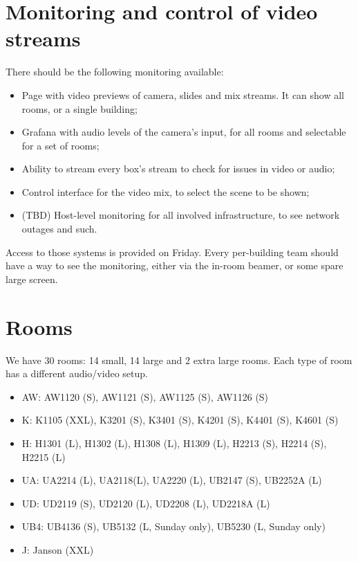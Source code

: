 \documentclass{article}
\begin{document}
\section{Monitoring and control of video streams}

There should be the following monitoring available:

\begin{itemize}
  \item Page with video previews of camera, slides and mix streams. It can show all rooms, or a single building;
  \item Grafana with audio levels of the camera's input, for all rooms and selectable for a set of rooms;
  \item Ability to stream every box's stream to check for issues in video or audio;
  \item Control interface for the video mix, to select the scene to be shown;
  \item (TBD) Host-level monitoring for all involved infrastructure, to see network outages and such.
\end{itemize}

Access to those systems is provided on Friday. Every per-building team should have a way to see the monitoring, either via the in-room beamer, or some spare large screen.



\section{Rooms}
We have 30 rooms: 14 small, 14 large and 2 extra large rooms. Each type of room has a different audio/video setup.
\begin{itemize}
  \item AW: AW1120 (S), AW1121 (S), AW1125 (S), AW1126 (S)
  \item K: K1105 (XXL), K3201 (S), K3401 (S), K4201 (S), K4401 (S), K4601 (S)
  \item H: H1301 (L), H1302 (L), H1308 (L), H1309 (L), H2213 (S), H2214 (S), H2215 (L)
  \item UA: UA2214 (L), UA2118(L), UA2220 (L), UB2147 (S), UB2252A (L)
  \item UD: UD2119 (S), UD2120 (L), UD2208 (L), UD2218A (L)
  \item UB4: UB4136 (S), UB5132 (L, Sunday only), UB5230 (L, Sunday only)
  \item J: Janson (XXL)
\end{itemize}
\end{document}
